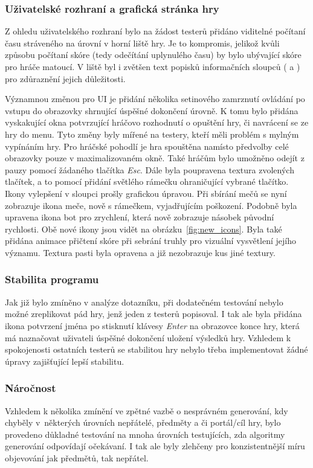 \subsubsection*{\textbullet Uživatelské rozhraní a grafická stránka hry}
Z ohledu uživatelského rozhraní bylo na žádost testerů přidáno viditelné počítaní času stráveného na úrovní v horní liště hry. Je to kompromis, jelikož kvůli způsobu počítaní skóre (tedy odečítání uplynulého času) by bylo ubývající skóre pro hráče matoucí. V liště byl i zvětšen text popisků informačních sloupců ( a ) pro zdůraznění jejich důležitosti.

Významnou změnou pro UI je přidání několika setinového zamrznutí ovládání po vstupu do obrazovky shrnující úspěšné dokončení úrovně. K tomu bylo přidána vyskakující okna potvrzující hráčovo rozhodnutí o opuštění hry, či navrácení se ze hry do menu. Tyto změny byly mířené na testery, kteří měli problém s mylným vypínáním hry. Pro hráčské pohodlí je hra spouštěna namísto předvolby celé obrazovky pouze v maximalizovaném okně. Také hráčům bylo umožněno odejít z pauzy pomocí žádaného tlačítka \textit{Esc}. Dále byla poupravena textura zvolených tlačítek, a to pomocí přidání světlého rámečku ohraničující vybrané tlačítko.
Ikony vylepšení v sloupci  prošly grafickou úpravou. Při sbírání mečů se nyní zobrazuje ikona meče, nově s rámečkem, vyjadřujícím poškození. Podobně byla upravena ikona bot pro zrychlení, která nově zobrazuje násobek původní rychlosti. Obě nové ikony jsou vidět na obrázku~\ref{fig:new_icons}. Byla také přidána animace přičtení skóre při sebrání truhly pro vizuální vysvětlení jejího významu. Textura pasti byla opravena a již nezobrazuje kus jiné textury.

\subsubsection*{\textbullet Stabilita programu}
Jak již bylo zmíněno v analýze dotazníku, při dodatečném testování nebylo možné zreplikovat pád hry, jenž jeden z testerů popisoval. I tak ale byla přidána ikona potvrzení jména po stisknutí klávesy \textit{Enter} na obrazovce konce hry, která má naznačovat uživateli úspěšné dokončení uložení výsledků hry. Vzhledem k spokojenosti ostatních testerů se stabilitou hry nebylo třeba implementovat žádné úpravy zajišťující lepší stabilitu.

\subsubsection*{\textbullet Náročnost}
Vzhledem k několika zmínění ve zpětné vazbě o nesprávném generování, kdy chyběly v~některých úrovních nepřátelé, předměty a či portál/cíl hry, bylo provedeno důkladné testování na mnoha úrovních testujících, zda algoritmy generování odpovídají očekávaní. I tak ale byly zlehčeny pro konzistentnější míru objevování jak předmětů, tak nepřátel.

